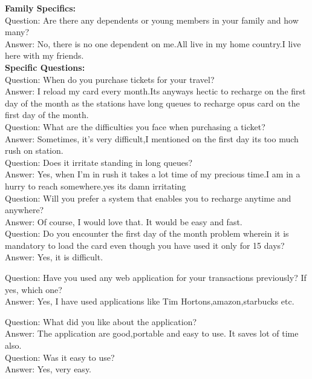 \documentclass[11pt, english]{report}
\begin{document}
\textbf{Family Specifics:}\\

Question: Are there any dependents or young members in your family and how many?\\
Answer: No, there is no one dependent on me.All live in my home country.I live here with my friends. \\

\textbf{Specific Questions:}\\

Question: When do you purchase tickets for your travel?\\
Answer: I reload my card every month.Its anyways hectic to recharge on the first day of the month as the stations have long queues to recharge opus card on the first day of the month.\\

Question: What are the difficulties you face when purchasing a ticket?\\
Answer: Sometimes, it's very difficult,I mentioned on the first day its too much rush on station.\\

Question: Does it irritate standing in long queues?\\
Answer: Yes, when I'm in rush it takes a lot time of my precious time.I am in a hurry to reach somewhere.yes its damn irritating\\

Question: Will you prefer a system that enables you to recharge anytime and anywhere?\\
Answer: Of course, I would love that. It would be easy and fast. \\

Question: Do you encounter the first day of the month problem wherein it is mandatory to load the
card even though you have used it only for 15 days?\\
Answer: Yes, it is difficult.

Question: Have you used any web application for your transactions previously? If yes, which one? \\
Answer: Yes, I have used applications like Tim Hortons,amazon,starbucks etc.

Question: What did you like about the application?\\
Answer: The application are good,portable and easy to use. It saves lot of time also.\\

Question: Was it easy to use?\\
Answer: Yes, very easy.\\
\end{document}
